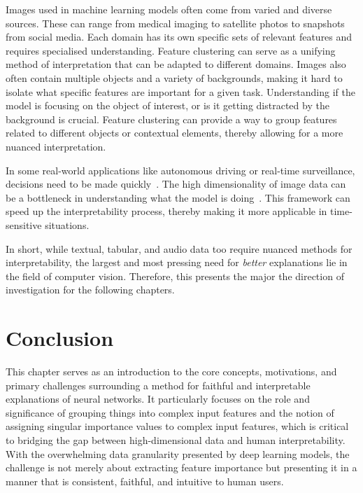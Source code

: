 Images used in machine learning models often come from varied and diverse sources. These can range from medical imaging to satellite photos to snapshots from social media. Each domain has its own specific sets of relevant features and requires specialised understanding. Feature clustering can serve as a unifying method of interpretation that can be adapted to different domains. Images also often contain multiple objects and a variety of backgrounds, making it hard to isolate what specific features are important for a given task. Understanding if the model is focusing on the object of interest, or is it getting distracted by the background is crucial. Feature clustering can provide a way to group features related to different objects or contextual elements, thereby allowing for a more nuanced interpretation.


In some real-world applications like autonomous driving or real-time surveillance, decisions need to be made quickly~\cite{Tian}. The high dimensionality of image data can be a bottleneck in understanding what the model is doing~\cite{Fong}. This framework can speed up the interpretability process, thereby making it more applicable in time-sensitive situations.

In short, while textual, tabular, and audio data too require nuanced methods for interpretability, the largest and most pressing need for \textit{better} explanations lie in the field of computer vision. Therefore, this presents the major the direction of investigation for the following chapters. 

\section{Conclusion}

This chapter serves as an introduction to the core concepts, motivations, and primary challenges surrounding a method for faithful and interpretable explanations of neural networks. It particularly focuses on the role and significance of grouping things into complex input features and the notion of assigning singular importance values to complex input features, which is critical to bridging the gap between high-dimensional data and human interpretability. With the overwhelming data granularity presented by deep learning models, the challenge is not merely about extracting feature importance but presenting it in a manner that is consistent, faithful, and intuitive to human users.


